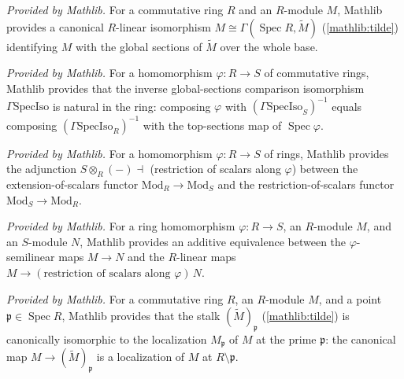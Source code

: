 \begin{lemma}
  \label{mathlib:tilde_isoTop}
  \mathlibok
  \textit{Provided by Mathlib.}
  For a commutative ring \(R\) and an \(R\)-module \(M\), Mathlib provides a canonical
  \(R\)-linear isomorphism \(M\cong\Gamma(\operatorname{Spec}R,\widetilde M)\)
  (\cref{mathlib:tilde}) identifying \(M\) with the global sections of \(\widetilde M\)
  over the whole base.
\end{lemma}

\begin{lemma}
  \label{mathlib:ΓSpecIso_naturality}
  \mathlibok
  \textit{Provided by Mathlib.}
  For a homomorphism \(\varphi:R\to S\) of commutative rings, Mathlib provides that the
  inverse global-sections comparison isomorphism \(\Gamma\mathrm{SpecIso}\) is natural in
  the ring: composing \(\varphi\) with \((\Gamma\mathrm{SpecIso}_S)^{-1}\) equals
  composing \((\Gamma\mathrm{SpecIso}_R)^{-1}\) with the top-sections map of
  \(\operatorname{Spec}\varphi\).
\end{lemma}

\begin{lemma}
  \label{mathlib:extendRestrictScalarsAdj}
  \mathlibok
  \textit{Provided by Mathlib.}
  For a homomorphism \(\varphi:R\to S\) of rings, Mathlib provides the adjunction
  \(S\otimes_R(-)\dashv\) (restriction of scalars along \(\varphi\)) between the
  extension-of-scalars functor \(\mathrm{Mod}_R\to\mathrm{Mod}_S\) and the
  restriction-of-scalars functor \(\mathrm{Mod}_S\to\mathrm{Mod}_R\).
\end{lemma}

\begin{lemma}
  \label{mathlib:semilinearMapAddEquiv}
  \mathlibok
  \textit{Provided by Mathlib.}
  For a ring homomorphism \(\varphi:R\to S\), an \(R\)-module \(M\), and an
  \(S\)-module \(N\), Mathlib provides an additive equivalence between the
  \(\varphi\)-semilinear maps \(M\to N\) and the \(R\)-linear maps
  \(M\to(\text{restriction of scalars along }\varphi)\,N\).
\end{lemma}

\begin{lemma}
  \label{mathlib:tilde_stalk_localization}
  \mathlibok
  \textit{Provided by Mathlib.}
  For a commutative ring \(R\), an \(R\)-module \(M\), and a point
  \(\mathfrak p\in\operatorname{Spec}R\), Mathlib provides that the stalk
  \((\widetilde M)_{\mathfrak p}\) (\cref{mathlib:tilde}) is canonically isomorphic
  to the localization \(M_{\mathfrak p}\) of \(M\) at the prime \(\mathfrak p\):
  the canonical map \(M\to(\widetilde M)_{\mathfrak p}\) is a localization of \(M\)
  at \(R\setminus\mathfrak p\).
\end{lemma}

